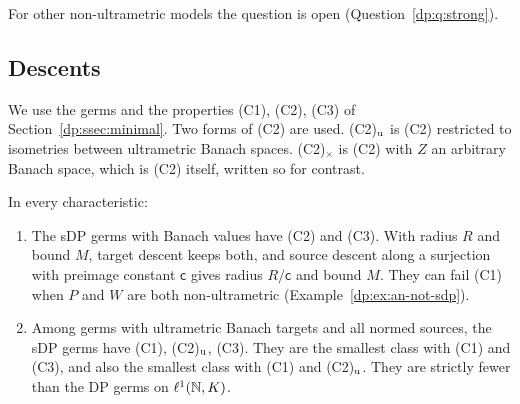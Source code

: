 For other non-ultrametric models the question is open (Question~\ref{dp:q:strong}).

\subsection{Descents}\label{dp:s:ssec-descents}

We use the germs and the properties (C1), (C2), (C3) of Section~\ref{dp:ssec:minimal}. Two forms of (C2) are used. (C2)$_{\rm u}$ is (C2) restricted to isometries between ultrametric Banach spaces. (C2)$_\times$ is (C2) with $Z$ an arbitrary Banach space, which is (C2) itself, written so for contrast.

\begin{theorem}\label{dp:thm:strong-descent}
In every characteristic:
\begin{enumerate}
\item The sDP germs with Banach values have \textup{(C2)} and \textup{(C3)}. With radius $R$ and bound $M$, target descent keeps both, and source descent along a surjection with preimage constant $\mathsf c$ gives radius $R/\mathsf c$ and bound $M$. They can fail \textup{(C1)} when $P$ and $W$ are both non-ultrametric (Example~\ref{dp:ex:an-not-sdp}).
\item Among germs with ultrametric Banach targets and all normed sources, the sDP germs have \textup{(C1)}, \textup{(C2)}$_{\rm u}$, \textup{(C3)}. They are the smallest class with \textup{(C1)} and \textup{(C3)}, and also the smallest class with \textup{(C1)} and \textup{(C2)}$_{\rm u}$. They are strictly fewer than the DP germs on $\ell^1(\mathbb N,K)$.
\end{enumerate}
\end{theorem}

